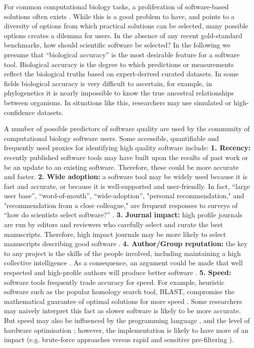 \documentclass[fleqn,10pt]{SelfArx} %
\begin{document}
For common computational biology tasks, a proliferation of
software-based solutions often exists
\cite{Felsenstein1995-ic,Altschul2013-bv,Henry2014-ut,Wikipedia_contributors2015-vj,Wikipedia_contributors2015-hr}. While
this is a good problem to have, and points to a
diversity of options from which practical solutions can be selected,
many possible options creates a dilemma for users. In the absence of
any recent gold-standard benchmarks, how should scientific software be
selected? In the following we presume that ``biological
accuracy'' is the most desirable feature for a software tool. Biological
accuracy is the degree to which predictions or measurements reflect
the biological truths based on expert-derived curated datasets. In some
fields biological accuracy is very difficult to ascertain, for
example, in phylogenetics it is nearly impossible to know the
true ancestral relationships between organisms. In situations like this,
researchers may use simulated or high-confidence datasets.

A number of possible predictors of software quality are used by the
community of computational biology software users. Some accessible,
quantifiable and frequently used proxies for identifying high quality
software include: \textbf{1. Recency:} recently published software
tools may have built upon the results of past work or be an update to
an existing software. Therefore, these could be more accurate and
faster. \textbf{2. Wide adoption:} a software tool may be widely used
because it is fast and accurate, or because it is well-supported and
user-friendly. In fact, “large user base”, “word-of-mouth”,
“wide-adoption”, "personal recommendation," and "recommendation from a
close colleague," are frequent responses to surveys of “how do
scientists select software?”
\cite{Hannay2009-cf,Joppa2013-vj,Loman2015-bw}. \textbf{3. Journal
  impact:} high profile journals are run by editors and reviewers who
carefully select and curate the best manuscripts. Therefore, high
impact journals may be more likely to select manuscripts describing
good software \cite{Garfield1955-wf}. \textbf{4. Author/Group
  reputation:} the key to any project is the skills of the people
involved, including maintaining a high collective intelligence
\cite{Joppa2013-vj,Woolley2010-ld,Cheruvelil2014-xn}. As a
consequence, an argument could be made that well respected and
high-profile authors will produce better software
\cite{Hirsch2005-mt,Bornmann2008-il}. \textbf{5. Speed:} software tools
frequently trade accuracy for speed. For example, heuristic
software such as the popular homology search tool, BLAST, compromise
the mathematical guarantee of optimal solutions for more speed
\cite{Altschul1990-ht,Altschul1997-ga}. Some researchers may naively
interpret this fact as slower software is likely to be more
accurate. But speed may also be influenced by the programming language
\cite{Fourment2008-vl}, and the level of hardware optimisation
\cite{Farrar2007-ky,Dematte2010-ph}; however, the implementation is
likely to have more of an impact (e.g. brute-force approaches versus
rapid and sensitive pre-filtering
\cite{Schaeffer1989-mu,Papadimitriou_undated-bo}).
\end{document}
